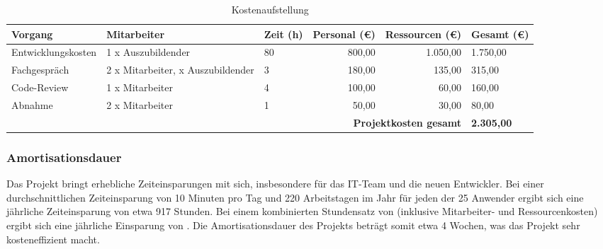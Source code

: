 \begin{table}[h!]
    \centering
    \footnotesize %
    \renewcommand{\arraystretch}{1.2} %
    \setlength{\tabcolsep}{7pt} %
    \begin{tabular*}{\textwidth}{|p{2.7cm}|p{3.0cm}|p{1.5cm}|r|r|p{1.9cm}|} %
    \hline
    \textbf{Vorgang}       & \textbf{Mitarbeiter}                 & \textbf{Zeit (h)} & \textbf{Personal (€)\footnotemark[6]} & \textbf{Ressourcen (€)\footnotemark[7]} & \textbf{Gesamt (€)} \\ \hline
    Entwicklungskosten     & 1 x Auszubildender                  & 80                & 800,00                 & 1.050,00                 & 1.750,00           \\ \hline
    Fachgespräch           & 2 x Mitarbeiter, \newline 1 x Auszubildender & 3                 & 180,00                 & 135,00                   & 315,00             \\ \hline
    Code-Review            & 1 x Mitarbeiter                      & 4                 & 100,00                 & 60,00                    & 160,00             \\ \hline
    Abnahme                & 2 x Mitarbeiter                      & 1                 & 50,00                  & 30,00                    & 80,00              \\ \hline
    \multicolumn{5}{|r|}{\textbf{Projektkosten gesamt}} & \textbf{2.305,00} \\ \hline
    \end{tabular*}
    \caption{Kostenaufstellung}
    \label{tab:Kostenaufstellung}
\end{table}


\subsubsection{Amortisationsdauer}
\label{sec:Amortisationsdauer}

Das Projekt bringt erhebliche Zeiteinsparungen mit sich, insbesondere für das IT-Team und die neuen Entwickler. Bei einer durchschnittlichen Zeiteinsparung von 10 Minuten pro Tag und 220 Arbeitstagen im Jahr für jeden der 25 Anwender ergibt sich eine jährliche Zeiteinsparung von etwa 917 Stunden. Bei einem kombinierten Stundensatz von  (inklusive Mitarbeiter- und Ressourcenkosten) ergibt sich eine jährliche Einsparung von . Die Amortisationsdauer des Projekts beträgt somit etwa 4 Wochen, was das Projekt sehr kosteneffizient macht.

